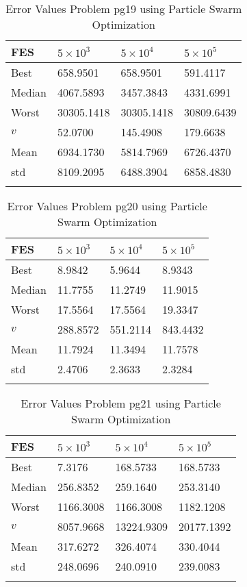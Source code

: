 \documentclass[10pt, a4paper]{book}
\begin{document}
\begin{center}
\begin{longtable}{l l l l}
FES & $5 \times 10^{3}$ & $5 \times 10^{4}$ & $5 \times 10^{5}$ \\
\hline
Best & 658.9501 & 658.9501 & 591.4117 \\
Median & 4067.5893 & 3457.3843 & 4331.6991 \\
Worst & 30305.1418 & 30305.1418 & 30809.6439 \\
$v$ & 52.0700 & 145.4908 & 179.6638 \\
Mean & 6934.1730 & 5814.7969 & 6726.4370 \\
std & 8109.2095 & 6488.3904 & 6858.4830 \\
\caption{ Error Values Problem pg19 using Particle Swarm Optimization }
\end{longtable}
\end{center}

\begin{center}
\begin{longtable}{l l l l}
FES & $5 \times 10^{3}$ & $5 \times 10^{4}$ & $5 \times 10^{5}$ \\
\hline
Best & 8.9842 & 5.9644 & 8.9343 \\
Median & 11.7755 & 11.2749 & 11.9015 \\
Worst & 17.5564 & 17.5564 & 19.3347 \\
$v$ & 288.8572 & 551.2114 & 843.4432 \\
Mean & 11.7924 & 11.3494 & 11.7578 \\
std & 2.4706 & 2.3633 & 2.3284 \\
\caption{ Error Values Problem pg20 using Particle Swarm Optimization }
\end{longtable}
\end{center}

\begin{center}
\begin{longtable}{l l l l}
FES & $5 \times 10^{3}$ & $5 \times 10^{4}$ & $5 \times 10^{5}$ \\
\hline
Best & 7.3176 & 168.5733 & 168.5733 \\
Median & 256.8352 & 259.1640 & 253.3140 \\
Worst & 1166.3008 & 1166.3008 & 1182.1208 \\
$v$ & 8057.9668 & 13224.9309 & 20177.1392 \\
Mean & 317.6272 & 326.4074 & 330.4044 \\
std & 248.0696 & 240.0910 & 239.0083 \\
\caption{ Error Values Problem pg21 using Particle Swarm Optimization }
\end{longtable}
\end{center}
\end{document}
